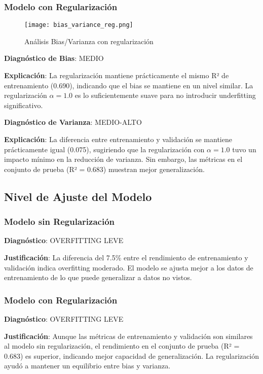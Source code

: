 \documentclass[11pt,a4paper]{article}
\begin{document}
\subsubsection{Modelo con Regularización}

\begin{figure}[H]
    \centering
    \texttt{[image: bias\_variance\_reg.png]}
    \caption{Análisis Bias/Varianza con regularización}
    \label{fig:bias_var_reg}
\end{figure}

\textbf{Diagnóstico de Bias}: MEDIO

\textbf{Explicación}: La regularización mantiene prácticamente el mismo R² de entrenamiento (0.690), indicando que el bias se mantiene en un nivel similar. La regularización $\alpha = 1.0$ es lo suficientemente suave para no introducir underfitting significativo.

\textbf{Diagnóstico de Varianza}: MEDIO-ALTO

\textbf{Explicación}: La diferencia entre entrenamiento y validación se mantiene prácticamente igual (0.075), sugiriendo que la regularización con $\alpha = 1.0$ tuvo un impacto mínimo en la reducción de varianza. Sin embargo, las métricas en el conjunto de prueba (R² = 0.683) muestran mejor generalización.

\subsection{Nivel de Ajuste del Modelo}

\subsubsection{Modelo sin Regularización}

\textbf{Diagnóstico}: OVERFITTING LEVE

\textbf{Justificación}: La diferencia del 7.5\% entre el rendimiento de entrenamiento y validación indica overfitting moderado. El modelo se ajusta mejor a los datos de entrenamiento de lo que puede generalizar a datos no vistos.

\subsubsection{Modelo con Regularización}

\textbf{Diagnóstico}: OVERFITTING LEVE

\textbf{Justificación}: Aunque las métricas de entrenamiento y validación son similares al modelo sin regularización, el rendimiento en el conjunto de prueba (R² = 0.683) es superior, indicando mejor capacidad de generalización. La regularización ayudó a mantener un equilibrio entre bias y varianza.
\end{document}
